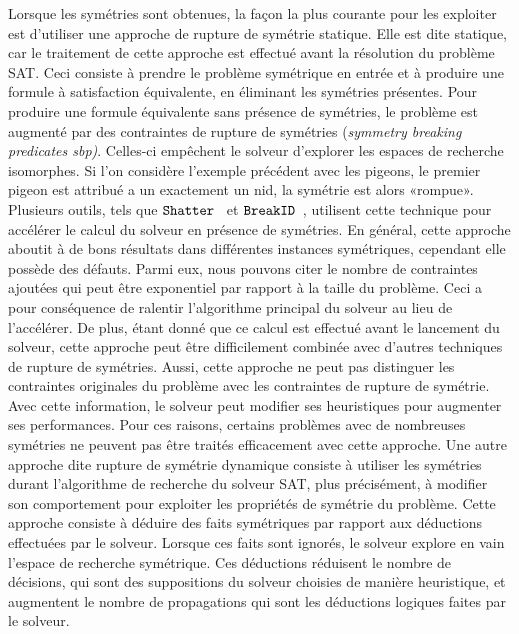 Lorsque les symétries sont obtenues, la façon la plus courante pour les exploiter est d'utiliser une approche de rupture de symétrie statique. Elle est dite statique, car le traitement de cette approche  est effectué avant la résolution du problème SAT.
Ceci consiste à prendre le problème symétrique en entrée et à produire une formule à satisfaction équivalente, en éliminant les symétries présentes. %
Pour produire une formule équivalente sans présence de symétries, le problème est augmenté par des 
contraintes de rupture de  symétries  (\textit{symmetry breaking predicates sbp)}.
 Celles-ci empêchent le solveur d'explorer les espaces de recherche isomorphes. 
Si l'on considère l'exemple précédent avec les pigeons, le premier pigeon est attribué a un
exactement un nid, la symétrie est alors «rompue».
Plusieurs outils, tels que $\texttt{Shatter}$~\cite{aloul06} et $\texttt{BreakID}$~\cite{devriendt2016improved}, utilisent cette technique pour accélérer le calcul du solveur en présence de symétries.
En général, cette approche aboutit à de bons résultats dans différentes instances symétriques, cependant elle possède des défauts. Parmi eux, nous pouvons citer le nombre de contraintes ajoutées qui peut être exponentiel par rapport à la taille du problème. Ceci a pour conséquence de ralentir l'algorithme principal du solveur au lieu de l'accélérer.
De plus, étant donné que ce calcul est effectué avant le lancement du solveur, cette approche peut être difficilement combinée avec d'autres techniques de rupture de symétries. Aussi, cette approche ne peut pas distinguer les contraintes originales du problème avec les contraintes de rupture de symétrie. Avec cette information, le solveur peut modifier ses heuristiques pour augmenter ses performances. Pour ces raisons, certains problèmes avec de nombreuses symétries ne peuvent pas être traités efficacement avec cette approche.
Une autre approche dite rupture de symétrie dynamique consiste à utiliser les symétries durant l'algorithme de recherche du solveur SAT, plus précisément, à modifier son comportement pour exploiter les propriétés de symétrie du problème. Cette approche consiste à déduire des faits symétriques par rapport aux déductions effectuées par le solveur. Lorsque ces faits sont ignorés, le solveur explore en vain l'espace de recherche symétrique.
Ces déductions réduisent le nombre de décisions, qui sont des suppositions du solveur choisies de 
manière heuristique, et augmentent le nombre de propagations qui sont les déductions logiques faites par le solveur. 
